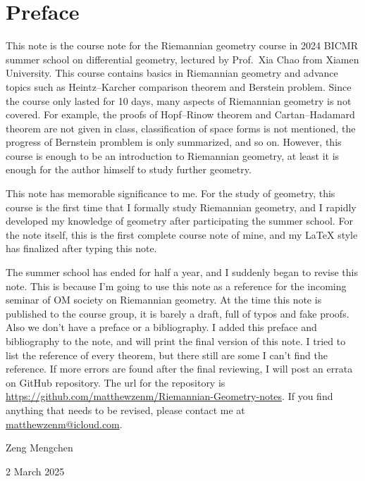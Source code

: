 \chapter{Preface}

This note is the course note for the Riemannian geometry course in 2024 BICMR summer school on differential geometry, lectured by Prof.\ Xia Chao from Xiamen University.
This course contains basics in Riemannian geometry and advance topics such as Heintz--Karcher comparison theorem and Berstein problem.
Since the course only lasted for 10 days, many aspects of Riemannian geometry is not covered.
For example, the proofs of Hopf--Rinow theorem and Cartan--Hadamard theorem are not given in class, classification of space forms is not mentioned, the progress of Bernstein promblem is only summarized, and so on.
However, this course is enough to be an introduction to Riemannian geometry, at least it is enough for the author himself to study further geometry.

This note has memorable significance to me.
For the study of geometry, this course is the first time that I formally study Riemannian geometry, and I rapidly developed my knowledge of geometry after participating the summer school.
For the note itself, this is the first complete course note of mine, and my \LaTeX{} style has finalized after typing this note.

The summer school has ended for half a year, and I suddenly began to revise this note.
This is because I'm going to use this note as a reference for the incoming seminar of OM society on Riemannian geometry.
At the time this note is published to the course group, it is barely a draft, full of typos and fake proofs.
Also we don't have a preface or a bibliography.
I added this preface and bibliography to the note, and will print the final version of this note.
I tried to list the reference of every theorem, but there still are some I can't find the reference.
If more errors are found after the final reviewing, I will post an errata on GitHub repository.
The url for the repository is \url{https://github.com/matthewzenm/Riemannian-Geometry-notes}.
If you find anything that needs to be revised, please contact me at \url{matthewzenm@icloud.com}.

\begin{flushright}
    Zeng Mengchen

    2 March 2025
\end{flushright}